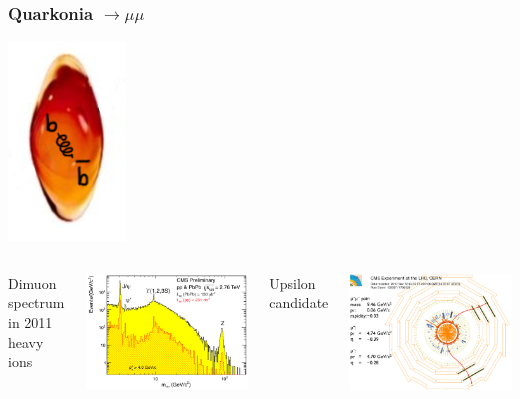 \documentclass[compress]{beamer}
\begin{document}
\begin{frame}
\frametitle{Quarkonia $\to \mu\mu$}

\vspace{-1.5 cm}
\hspace{3 cm} \includegraphics[height=1.5 cm]{droplets2_small.png}

\vspace{0.5 cm}

\begin{columns}
Dimuon spectrum in 2011 heavy ions

\includegraphics[width=\linewidth]{dimuons/dimuons_2011.png}

Upsilon candidate

\includegraphics[width=\linewidth]{dimuons/upsilon_eventdisplay.png}


\end{columns}
\end{frame}
\end{document}
